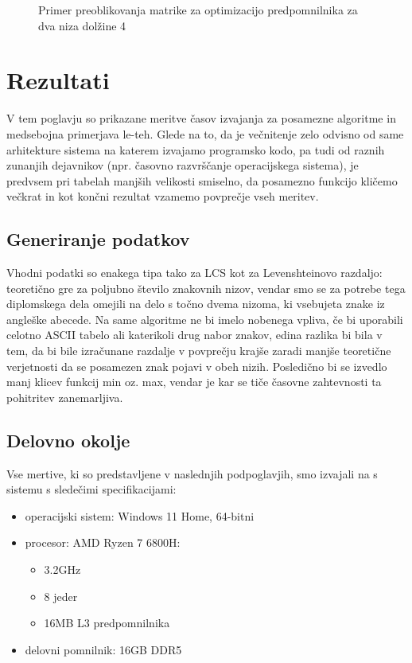 \documentclass[a4paper,12pt,openright]{book}
\begin{document}
\begin{figure}[htb]
\caption{Primer preoblikovanja matrike za optimizacijo predpomnilnika za dva niza dolžine 4}
\label{matrixTransformation}
\end{figure}









\chapter{Rezultati}

V tem poglavju so prikazane meritve časov izvajanja za posamezne algoritme in medsebojna primerjava le-teh. Glede na to, da je večnitenje zelo odvisno od same arhitekture sistema na katerem izvajamo programsko kodo, pa tudi od raznih zunanjih dejavnikov (npr. časovno razvrščanje operacijskega sistema), je predvsem pri tabelah manjših velikosti smiselno, da posamezno funkcijo kličemo večkrat in kot končni rezultat vzamemo povprečje vseh meritev. 

\section{Generiranje podatkov}

Vhodni podatki so enakega tipa tako za LCS kot za Levenshteinovo razdaljo: teoretično gre za poljubno število znakovnih nizov, vendar smo se za potrebe tega diplomskega dela omejili na delo s točno dvema nizoma, ki vsebujeta znake iz angleške abecede. Na same algoritme ne bi imelo nobenega vpliva, če bi uporabili celotno ASCII tabelo ali katerikoli drug nabor znakov, edina razlika bi bila v tem, da bi bile izračunane razdalje v povprečju krajše zaradi manjše teoretične verjetnosti da se posamezen znak pojavi v obeh nizih. Posledično bi se izvedlo manj klicev funkcij min oz. max, vendar je kar se tiče časovne zahtevnosti ta pohitritev zanemarljiva. 

\section{Delovno okolje}

Vse mertive, ki so predstavljene v naslednjih podpoglavjih, smo izvajali na s sistemu s sledečimi specifikacijami:
\begin{itemize}
    \item operacijski sistem: Windows 11 Home, 64-bitni
    \item procesor: AMD Ryzen 7 6800H:
        \begin{itemize}
            \item 3.2GHz
            \item 8 jeder
            \item 16MB L3 predpomnilnika
        \end{itemize}
    \item delovni pomnilnik: 16GB DDR5
\end{itemize}
\end{document}

